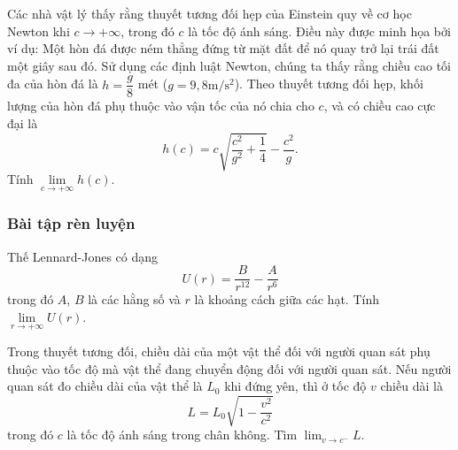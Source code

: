 \begin{vd}%
	Các nhà vật lý  thấy rằng thuyết tương đối hẹp của Einstein quy về cơ học Newton khi $c \rightarrow +\infty$, trong đó $c$ là tốc độ ánh sáng. Điều này được minh họa bởi ví dụ: Một hòn đá được ném thẳng đứng từ mặt đất để nó quay trở lại trái đất một giây sau đó. Sử dụng các định luật Newton, chúng ta thấy rằng chiều cao tối đa của hòn đá là $h=\dfrac{g}{8}$ mét ($g = 9{,}8 \mathrm{m/ s ^2}$). Theo thuyết tương đối hẹp, khối lượng của hòn đá phụ thuộc vào vận tốc của nó chia cho $c$, và có chiều cao cực đại là 
	\[
	h(c)=c \sqrt{\dfrac{c^2}{g^2}+\dfrac{1}{4}}- \dfrac{c^2}{g}.
	\]
	Tính $\lim\limits _{c \rightarrow +\infty} h(c)$.
\end{vd}

\subsubsection{Bài tập rèn luyện}
\begin{bt}%
	Thế Lennard-Jones có dạng $$U(r) = \dfrac{B}{r^{12}} - \dfrac{A}{r^6}$$ trong đó $A$, $B$ là các hằng số và $r$ là khoảng cách giữa các hạt. 
	Tính $\lim\limits _{r \rightarrow +\infty} U(r)$.
\end{bt}

\begin{bt}%
	Trong thuyết tương đối, chiều dài của một vật thể đối với người quan sát phụ thuộc vào tốc độ mà vật thể đang chuyển động đối với người quan sát. Nếu người quan sát đo chiều dài của vật thể là $L_0$ khi đứng yên, thì ở tốc độ $v$ chiều dài  là
	$$
	L=L_0 \sqrt{1-\frac{v^2}{c^2}}
	$$
	trong đó $c$ là tốc độ ánh sáng trong chân không. Tìm $\displaystyle \lim _{v \rightarrow c^{-}} L$. 
\end{bt}

